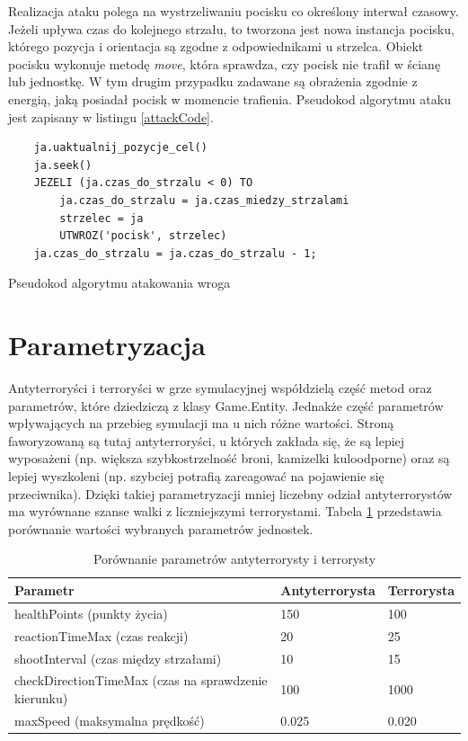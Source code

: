 Realizacja ataku polega na wystrzeliwaniu pocisku co określony interwał czasowy. Jeżeli upływa czas do kolejnego strzału, to tworzona jest nowa instancja pocisku, którego pozycja i orientacja są zgodne z odpowiednikami u strzelca. Obiekt pocisku wykonuje metodę \emph{move}, która sprawdza, czy pocisk nie trafił w ścianę lub jednostkę. W tym drugim przypadku zadawane są obrażenia zgodnie z energią, jaką posiadał pocisk w momencie trafienia. Pseudokod algorytmu ataku jest zapisany w listingu \ref{attackCode}.

\begin{table}
\begin{center}
\begin{lstlisting}
	ja.uaktualnij_pozycje_cel()
	ja.seek()				
	JEZELI (ja.czas_do_strzalu < 0) TO
		ja.czas_do_strzalu = ja.czas_miedzy_strzalami
		strzelec = ja
		UTWROZ('pocisk', strzelec)
	ja.czas_do_strzalu = ja.czas_do_strzalu - 1;
\end{lstlisting}
\caption {Pseudokod algorytmu atakowania wroga}
\label{attackCode}
\end{center}
\end{table}

\section{Parametryzacja}

Antyterroryści i terroryści w grze symulacyjnej współdzielą część metod oraz parametrów, które dziedziczą z klasy Game.Entity. Jednakże część parametrów wpływających na przebieg symulacji ma u nich różne wartości. Stroną faworyzowaną są tutaj antyterroryści, u których zakłada się, że są lepiej wyposażeni (np. większa szybkostrzelność broni, kamizelki kuloodporne) oraz są lepiej wyszkoleni (np. szybciej potrafią zareagować na pojawienie się przeciwnika). Dzięki takiej parametryzacji mniej liczebny odział antyterrorystów ma wyrównane szanse walki z liczniejszymi terrorystami. Tabela \ref{parameters} przedstawia porównanie wartości wybranych parametrów jednostek.

\begin{table}
\begin{center}
\begin{tabular}{|p{} | p{} p{}|}
\hline
Parametr & Antyterrorysta & Terrorysta\\\hline
	healthPoints (punkty życia) & 150 & 100\\\hline
	reactionTimeMax (czas reakcji) & 20 & 25\\\hline
	shootInterval (czas między strzałami) & 10 & 15\\\hline
	checkDirectionTimeMax (czas na sprawdzenie kierunku) & 100 & 1000\\\hline
	maxSpeed (maksymalna prędkość) & 0.025 & 0.020\\
\hline
\end{tabular}
\caption {Porównanie parametrów antyterrorysty i terrorysty\label{parameters}}
\end{center}
\end{table} 

